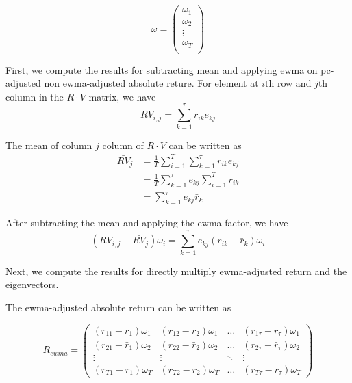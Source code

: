 \documentclass{amsart}
\theoremstyle{plain}
\numberwithin{equation}{section}
\begin{document}
\begin{equation}
\omega =\begin{pmatrix}
\omega_1\\
\omega_2\\
\vdots\\
\omega_T\\
\end{pmatrix}
\end{equation}

First, we compute the results for subtracting mean and applying ewma on pc-adjusted non ewma-adjusted absolute reture.
For element at $i$th row and $j$th column in the $R\cdot V$ matrix, we have
\begin{equation}
RV_{i,j}=\sum_{k=1}^\tau r_{ik} e_{kj}
\end{equation}

The mean of column $j$ column of $R\cdot V$ can be written as
\begin{equation}
\begin{split}
\bar{RV}_j &=\frac{1}{T} \sum_{i=1}^T \sum_{k=1}^\tau r_{ik} e_{kj} \\
&=\frac{1}{T} \sum_{k=1}^\tau e_{kj} \sum_{i=1}^T r_{ik} \\
&=\sum_{k=1}^\tau e_{kj} \bar{r}_k
\end{split}
\end{equation}

After subtracting the mean and applying the ewma factor, we have
\begin{equation}
(RV_{i,j} - \bar{RV}_j) \omega_i =\sum_{k=1}^\tau e_{kj} (r_{ik} - \bar{r}_k) \omega_i
\end{equation}
 
Next, we compute the results for directly multiply ewma-adjusted return and the eigenvectors.

The ewma-adjusted absolute return can be written as

\begin{equation}
R_{ewma}=\begin{pmatrix}
(r_{11}-\bar{r}_1)\omega_1 & (r_{12}-\bar{r}_2)\omega_1 & \ldots & (r_{1\tau}-\bar{r}_\tau)\omega_1 \\
(r_{21}-\bar{r}_1)\omega_2 & (r_{22}-\bar{r}_2)\omega_2 & \ldots & (r_{2\tau}-\bar{r}_\tau)\omega_2 \\
\vdots & \vdots & \ddots & \vdots \\
(r_{T1}-\bar{r}_1)\omega_T & (r_{T2}-\bar{r}_2)\omega_T & \ldots & (r_{T\tau}-\bar{r}_\tau)\omega_T
\end{pmatrix}
\end{equation}
\end{document}
